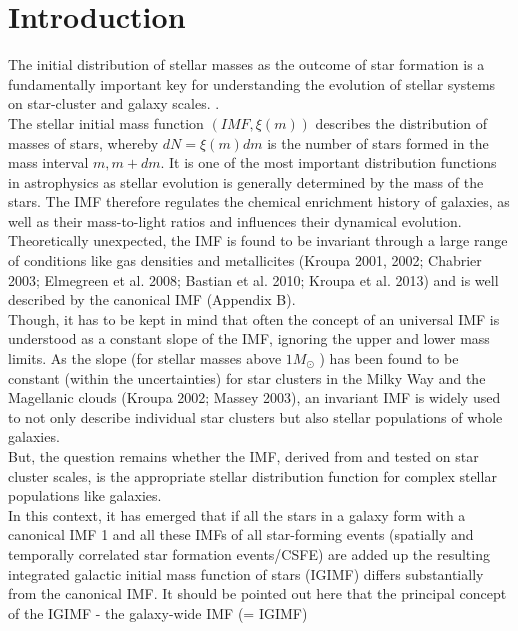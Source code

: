\section*{Introduction}
The initial distribution of stellar masses as the outcome of star formation is a fundamentally important key for understanding the evolution of stellar systems on star-cluster and
galaxy scales. \cite{yan-kroupa}. 
\\The stellar initial mass function $(IMF, \xi(m))$ describes the distribution of masses of stars, whereby $dN = \xi(m)dm$ is the number of stars formed in the mass interval $m, m + dm$. It is one of the most important distribution functions in astrophysics as stellar evolution is generally determined by the mass of the stars. The IMF therefore regulates the chemical enrichment history of galaxies, as well as their mass-to-light ratios and influences their dynamical evolution.\cite{kroupa-weidner} \\
Theoretically unexpected, the IMF is found to be invariant through a large range of conditions like gas densities and metallicites (Kroupa 2001, 2002;
Chabrier 2003; Elmegreen et al. 2008; Bastian et al. 2010; Kroupa et al. 2013) and is well described by the canonical IMF (Appendix B).\\ Though, it has to be kept in mind that often the concept of an universal IMF is understood as a constant slope
of the IMF, ignoring the upper and lower mass limits. As the slope (for stellar masses above $1 M_{\odot}$ ) has been found to be
constant (within the uncertainties) for star clusters in the Milky Way and the Magellanic clouds (Kroupa 2002; Massey 2003),
an invariant IMF is widely used to not only describe individual star clusters but also stellar populations of whole galaxies.\\ But,
the question remains whether the IMF, derived from and tested on star cluster scales, is the appropriate stellar distribution
function for complex stellar populations like galaxies. \\ In this context, it has emerged that if all the stars in a galaxy form
with a canonical IMF 1 and all these IMFs of all star-forming events (spatially and temporally correlated star formation
events/CSFE) are added up the resulting integrated galactic initial mass function of stars (IGIMF) differs substantially from the canonical IMF. It should be pointed out here that the principal concept of the IGIMF - the galaxy-wide IMF (= IGIMF)
